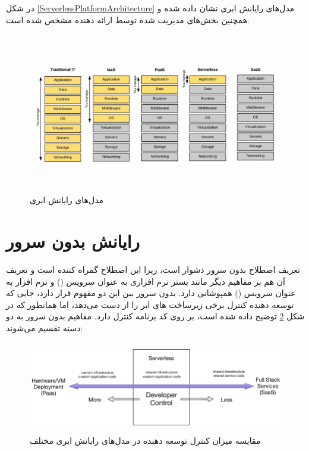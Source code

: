 در شکل \ref{ServerlessPlatformArchitecture} مدل‌های رایانش ابری نشان داده شده و همچنین بخش‌های مدیریت شده توسط ارائه دهنده مشخص شده‌ است.

\begin{figure}[!h]
	\centering
	\includegraphics[height=7cm]{images/cloud-computing-service-models}
	\caption{مدل‌های رایانش ابری}
	\label{cloudComputingServiceModels}
\end{figure}

\newpage

\section{رایانش بدون سرور}

تعریف اصطلاح بدون سرور دشوار است، زیرا این اصطلاح گمراه کننده است و تعریف آن هم بر مفاهیم دیگر مانند بستر نرم افزاری به عنوان سرویس () و نرم افزار به عنوان سرویس () همپوشانی دارد. بدون سرور بین این دو مفهوم قرار دارد، جایی که توسعه دهنده کنترل برخی زیرساخت های ابر را از دست می‌دهد، اما همانطور که در شکل \ref{developerControlAndServerless} توضیح داده شده است، بر روی کد برنامه کنترل دارد. مفاهیم بدون سرور به دو دسته تقسیم می‌شوند:

\begin{figure}[!h]
	\centering
	\includegraphics[height=4cm]{images/Developer-control-and-Serverless-computing}
	\caption{مقایسه میزان کنترل توسعه دهنده در مدل‌های رایانش ابری مختلف}
	\label{developerControlAndServerless}
\end{figure}

